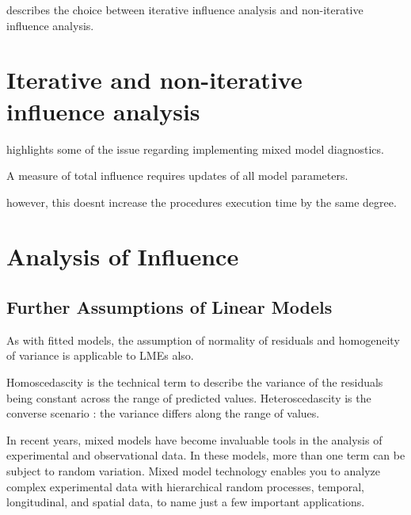 \documentclass[12pt, a4paper]{article}
\begin{document}
\citet{schabenberger} describes the choice between  iterative influence analysis and  non-iterative influence analysis.



\section{Iterative and non-iterative influence analysis} %
\citet{schabenberger} highlights some of the issue regarding implementing mixed model diagnostics.


A measure of total influence requires updates of all model parameters.


however, this doesnt increase the procedures execution time by the same degree.

\section{Analysis of  Influence}



\subsection{Further Assumptions of Linear Models}

As with fitted models, the assumption of normality of residuals and homogeneity of variance is applicable to LMEs also. 



Homoscedascity is the technical term to describe the variance of the residuals being constant across the range of predicted values.
Heteroscedascity is the converse scenario : the variance differs along the range of values.


% 
% 



In recent years, mixed models have become invaluable tools in the analysis of experimental and observational
data. In these models, more than one term can be subject to random variation. Mixed model technology enables you to analyze complex experimental data with hierarchical random processes, temporal,
longitudinal, and spatial data, to name just a few important applications. 
\end{document}
